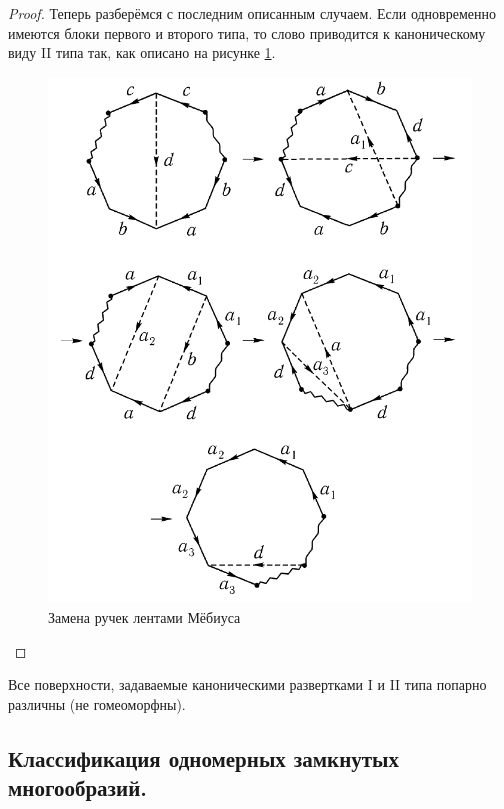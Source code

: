 \documentclass[12pt,a4paper]{article}
\begin{document}
\begin{proof}
        Теперь разберёмся с последним описанным случаем. Если одновременно имеются блоки первого и второго типа, то слово приводится к каноническому виду II типа так, как описано на рисунке \ref{surface_typisation_picture_6}.
        \begin{figure}[p]
            \centering
            \includegraphics[width=\textwidth]{GaT-4.png}
            \caption{Замена ручек лентами Мёбиуса}
            \label{surface_typisation_picture_6}
        \end{figure}
    \end{proof}

    \begin{theorem}
        Все поверхности, задаваемые каноническими развертками I и II типа попарно различны (не гомеоморфны).
    \end{theorem}

    \subsection{Классификация одномерных замкнутых многообразий.}
\end{document}
